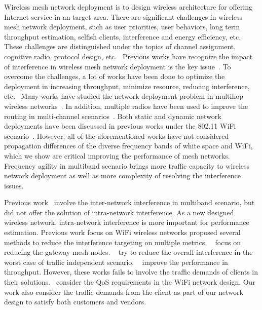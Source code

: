 Wireless mesh network deployment is to design wireless architecture
for offering Internet service in an target area.
There are significant challenges in wireless mesh network deployment,
such as user priorities, user behaviors, long term throughput estimation, selfish clients,
interference and energy efficiency, etc.~\cite{tragos2013spectrum}
These challenges are distinguished under the topics of channel assignment,
cognitive radio, protocol design, etc.~\cite{tragos2013spectrum,akyildiz2006next}
Previous works have recognize the impact of interference in 
wireless mesh network deployment is the key issue~\cite{tang2005interference,irwin2013resource,chieochan2013channel}.
To overcome the challenges, a lot of works have been done to optimize the 
deployment in increasing throughput, minimize resource, reducing interference,
etc.~\cite{irwin2013resource,subramanian2008minimum,doraghinejad2014channel}
Many works have studied the network deployment problem in multihop wireless
networks~\cite{jain2005impact,akyildiz2005wireless,raniwala2004centralized,tragos2013spectrum}.
In addition, multiple radios have been used to improve the routing in multi-channel
scenarios~\cite{draves2004routing,irwin2013resource}. 
Both static and dynamic network deployments have been discussed in previous works under
the 802.11 WiFi scenario~\cite{wu2006analysis,ramachandran2006interference,subramanian2008minimum}. 
However, all of the aforementioned works have not considered propagation 
differences of the diverse frequency bands of white space and WiFi, which we show are 
critical improving the performance of mesh networks.
Frequency agility in multiband scenario brings more traffic capacity to 
wireless network deployment as well as more complexity of resolving the interference issues.

Previous work~\cite{pcuiwinmee} involve the inter-network interference in
multiband scenario, but did not offer the solution of intra-network interference.
As a new designed wireless network, intra-network interference is 
more important for performance estimation. Previous work focus on
WiFi wireless networks proposed several methods to reduce the 
interference targeting on multiple metrics.
~\cite{tang2005interference,he2008optimizing,robinson2010deploying}
focus on reducing the gateway mesh nodes. ~\cite{irwin2013resource,subramanian2008minimum} try to reduce the
overall interference in the worst case of traffic independent scenario.
~\cite{chieochan2013channel,li2012channel} improve the performance
in throughput. However, these works fails to involve the traffic demands
of clients in their solutions.~\cite{robinson2010deploying,long2013fair} consider
the QoS requirements in the WiFi network design. Our work also
consider the traffic demands from the client as part of our 
network design to satisfy both customers and vendors.

